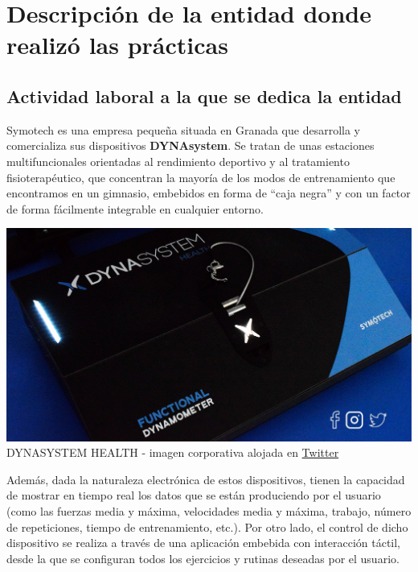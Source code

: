 \documentclass[13pt]{scrartcl}
\begin{document}
	\section{Descripción de la entidad donde realizó las prácticas}
	
		\subsection{Actividad laboral a la que se dedica la entidad}
			Symotech es una empresa pequeña situada en Granada que desarrolla y comercializa sus dispositivos \textbf{DYNAsystem}. Se tratan de unas estaciones multifuncionales orientadas al rendimiento deportivo y al tratamiento fisioterapéutico, que concentran la mayoría de los modos de entrenamiento que encontramos en un gimnasio, embebidos en forma de ``caja negra'' y con un factor de forma fácilmente integrable en cualquier entorno.
			
			\begin{center}
				\includegraphics[scale=0.22]{images/dynasystem-blue-floor.jpeg}\\
				DYNASYSTEM HEALTH - imagen corporativa alojada en \href{https://twitter.com/dynasystem_}{Twitter}
			\end{center}
			
			Además, dada la naturaleza electrónica de estos dispositivos, tienen la capacidad de mostrar en tiempo real los datos que se están produciendo por el usuario (como las fuerzas media y máxima, velocidades media y máxima, trabajo, número de repeticiones, tiempo de entrenamiento, etc.). Por otro lado, el control de dicho dispositivo se realiza a través de una aplicación embebida con interacción táctil, desde la que se configuran todos los ejercicios y rutinas deseadas por el usuario.
			
\end{document}
